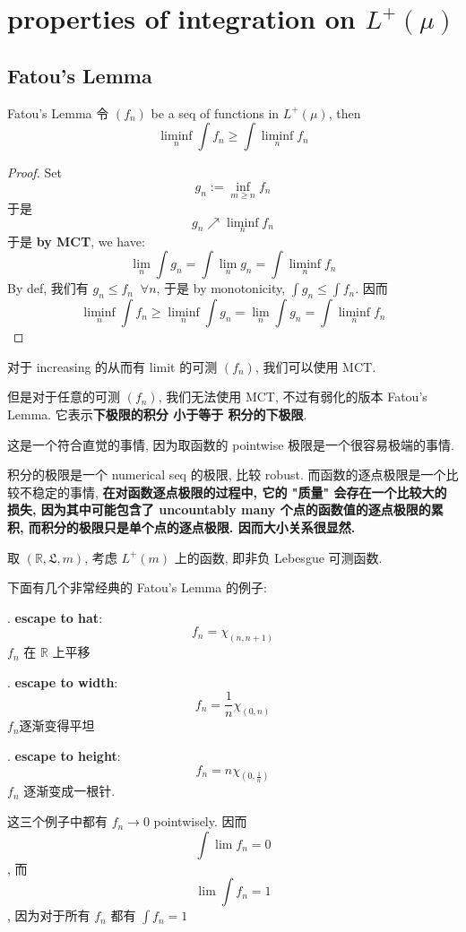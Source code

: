 \documentclass[lang=cn,11pt]{elegantbook}
\begin{document}
\chapter{properties of integration on $L^+(\mu)$}
\section{Fatou's Lemma}
\begin{theorem}{Fatou's Lemma}
    \label{Fatou's Lemma}
 令 $(f_n)$ be a seq of functions in $L^+(\mu)$, then $$ \liminf_n \int f_n \geq \int \liminf_n f_n$$
\end{theorem}

\begin{proof}
    Set \[g_n := \inf_{m \geq n }     f_n   \]于是 \[g_n \nearrow \liminf_n f_n\]
于是\textbf{ by MCT}, we have: \[  \lim_n \int g_n =  \int \lim_n g_n =      \int \liminf_n f_n  \]
By def, 我们有 $g_n \leq f_n \;\;\forall n$, 于是 by monotonicity, $\int g_n \leq \int f_n$. 因而 \[  \liminf_n \int f_n \geq \liminf_n \int g_n  = \lim_n \int g_n = \int \liminf_n f_n   \]
\end{proof}
\begin{remark}
    对于 increasing 的从而有 limit 的可测 $(f_n)$, 我们可以使用 MCT.

    但是对于任意的可测 $(f_n)$, 我们无法使用 MCT, 不过有弱化的版本 Fatou's Lemma. 它表示\textbf{下极限的积分 小于等于 积分的下极限}.

    这是一个符合直觉的事情, 因为取函数的 pointwise 极限是一个很容易极端的事情. 
    
    积分的极限是一个 numerical seq 的极限, 比较 robust. 而函数的逐点极限是一个比较不稳定的事情, \textbf{在对函数逐点极限的过程中, 它的 "质量" 会存在一个比较大的损失, 因为其中可能包含了 uncountably many 个点的函数值的逐点极限的累积, 而积分的极限只是单个点的逐点极限. 因而大小关系很显然. }
\end{remark}


\begin{example}
    取 $(\mathbb{R},\mathfrak{L}, m)$, 考虑 $L^+(m)$ 上的函数, 即非负 Lebesgue 可测函数.

    下面有几个非常经典的 Fatou's Lemma 的例子:

. \textbf{escape to hat}: \[f_n = \chi_{(n,n+1)}\]
$f_n$ 在 $\mathbb{R}$ 上平移

   . \textbf{escape to width}: \[f_n = \frac{1}{n}  \chi_{(0,n)}\]
    $f_n$逐渐变得平坦
    
 . \textbf{escape to height}: \[ f_n = n \chi_{(0,\frac{1}{n})}\]
$f_n$ 逐渐变成一根针.

这三个例子中都有 $f_n \rightarrow 0$ pointwisely. 因而 $$\int \lim f_n = 0$$, 而 $$\lim \int f_n = 1$$, 因为对于所有 $f_n$ 都有 $\int f_n = 1$
\end{example}
\end{document}
